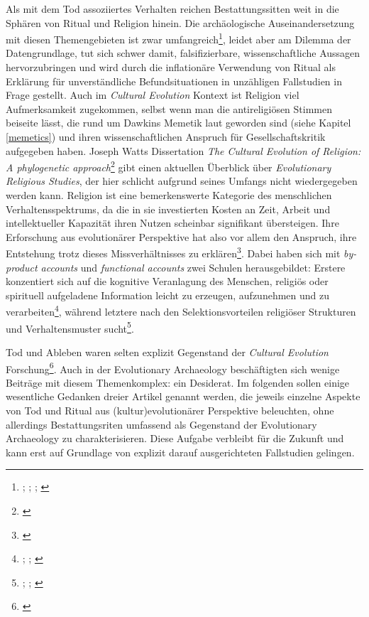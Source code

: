 \documentclass[openany,twoside,twocolumn]{book}
\let\rmarkdownfootnote\footnote%
\def\footnote{\protect\rmarkdownfootnote}
\begin{document}
Als mit dem Tod assoziiertes Verhalten reichen Bestattungssitten weit in
die Sphären von Ritual und Religion hinein. Die archäologische
Auseinandersetzung mit diesen Themengebieten ist zwar
umfangreich\footnote{\textcite{bertemes_archaeology_2001};
  \textcite{chapman_archaeology_1981};
  \textcite{insoll_archaeology_2004};
  \textcite{renfrew_archaeology_1994}}, leidet aber am Dilemma der
Datengrundlage, tut sich schwer damit, falsifizierbare,
wissenschaftliche Aussagen hervorzubringen und wird durch die
inflationäre Verwendung von Ritual als Erklärung für unverständliche
Befundsituationen in unzähligen Fallstudien in Frage gestellt. Auch im
\emph{Cultural Evolution} Kontext ist Religion viel Aufmerksamkeit
zugekommen, selbst wenn man die antireligiösen Stimmen beiseite lässt,
die rund um Dawkins Memetik laut geworden sind (siehe Kapitel
\ref{memetics}) und ihren wissenschaftlichen Anspruch für
Gesellschaftskritik aufgegeben haben. Joseph Watts Dissertation
\emph{The Cultural Evolution of Religion: A phylogenetic
approach}\footnote{\textcite{watts_cultural_2016}} gibt einen aktuellen
Überblick über \emph{Evolutionary Religious Studies}, der hier schlicht
aufgrund seines Umfangs nicht wiedergegeben werden kann. Religion ist
eine bemerkenswerte Kategorie des menschlichen Verhaltensspektrums, da
die in sie investierten Kosten an Zeit, Arbeit und intellektueller
Kapazität ihren Nutzen scheinbar signifikant übersteigen. Ihre
Erforschung aus evolutionärer Perspektive hat also vor allem den
Anspruch, ihre Entstehung trotz dieses Missverhältnisses zu
erklären\footnote{\textcite{wilson_evolutionary_2012-1}}. Dabei haben
sich mit \emph{by-product accounts} und \emph{functional accounts} zwei
Schulen herausgebildet: Erstere konzentiert sich auf die kognitive
Veranlagung des Menschen, religiös oder spirituell aufgeladene
Information leicht zu erzeugen, aufzunehmen und zu verarbeiten\footnote{\textcite{barrett_exploring_2000};
  \textcite{baumard_explaining_2013}; \textcite{boyer_evolutionary_2008}},
während letztere nach den Selektionsvorteilen religiöser Strukturen und
Verhaltensmuster sucht\footnote{\textcite{norenzayan_cultural_2016};
  \textcite{sosis_adaptationist-byproduct_2009};
  \textcite{wilson_darwins_2002}}.

Tod und Ableben waren selten explizit Gegenstand der \emph{Cultural
Evolution} Forschung\footnote{\textcite{falger_cultural_2003}}. Auch in
der Evolutionary Archaeology beschäftigten sich wenige Beiträge mit
diesem Themenkomplex: ein Desiderat. Im folgenden sollen einige
wesentliche Gedanken dreier Artikel genannt werden, die jeweils einzelne
Aspekte von Tod und Ritual aus (kultur)evolutionärer Perspektive
beleuchten, ohne allerdings Bestattungsriten umfassend als Gegenstand
der Evolutionary Archaeology zu charakterisieren. Diese Aufgabe
verbleibt für die Zukunft und kann erst auf Grundlage von explizit
darauf ausgerichteten Fallstudien gelingen.
\end{document}
